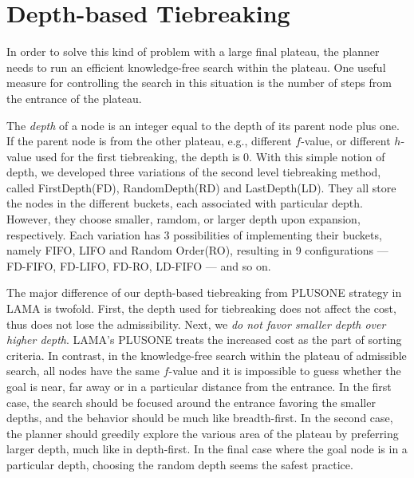 \section{Depth-based Tiebreaking}

In order to solve this kind of problem with a large final plateau, the
planner needs to run an efficient knowledge-free search within the
plateau.  One useful measure for controlling the search in this
situation is the number of steps from the entrance of the plateau.

The \emph{depth} of a node is an integer equal to the depth of its
parent node plus one. If the parent node is from the other plateau,
e.g., different $f$-value, or different $h$-value used for the first
tiebreaking, the depth is 0.  With this simple notion of depth, we
developed three variations of the second level tiebreaking method,
called FirstDepth(FD), RandomDepth(RD) and LastDepth(LD). They all
store the nodes in the different buckets, each associated with
particular depth. However, they choose smaller, ramdom, or larger depth
upon expansion, respectively.
Each variation has 3 possibilities of implementing their buckets,
namely FIFO, LIFO and Random Order(RO), resulting in 9 configurations ---
FD-FIFO, FD-LIFO, FD-RO, LD-FIFO --- and so on.

The major difference of our depth-based tiebreaking from PLUSONE
strategy in LAMA is twofold.  First, the depth used for tiebreaking does
not affect the cost, thus does not lose the admissibility. Next, we
\emph{do not favor smaller depth over higher depth}. LAMA's PLUSONE
treats the increased cost as the part of sorting criteria. In contrast,
in the knowledge-free search within the plateau of admissible search,
all nodes have the same $f$-value and it is impossible to guess whether
the goal is near, far away or in a particular distance from the
entrance. In the first case, the search should be focused around the
entrance favoring the smaller depths, and the behavior should be much
like breadth-first. In the second case, the planner should greedily
explore the various area of the plateau by preferring larger depth, much
like in depth-first. In the final case where the goal node is in a
particular depth, choosing the random depth seems the safest practice.


